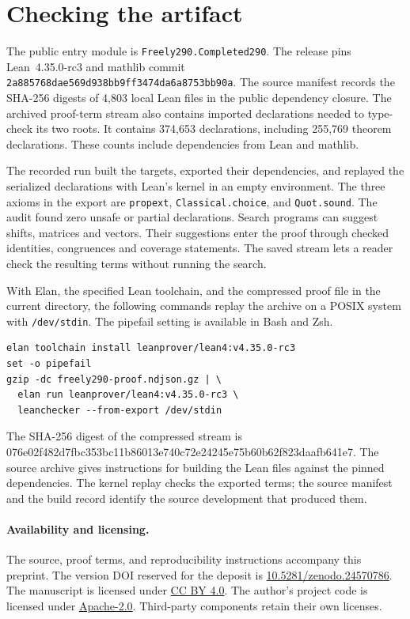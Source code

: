 \documentclass[11pt,a4paper]{article}
\newcommand{\code}[1]{\texttt{#1}}
\begin{document}
\section{Checking the artifact}
The public entry module is \code{Freely290.Completed290}. The release
pins Lean~4.35.0-rc3 \cite{Lean} and mathlib commit
\code{2a885768dae569d938bb9ff3474da6a8753bb90a}.
The source manifest records the SHA-256 digests of 4,803 local Lean
files in the public dependency closure. The archived proof-term stream
also contains imported declarations needed to type-check its two roots.
It contains 374,653 declarations, including 255,769 theorem declarations.
These counts include dependencies from Lean and mathlib.

The recorded run built the targets, exported their dependencies, and
replayed the serialized declarations with Lean's kernel in an empty
environment. The three axioms in the export are \code{propext},
\code{Classical.choice}, and \code{Quot.sound}. The audit found zero
unsafe or partial declarations. Search programs can suggest shifts,
matrices and vectors. Their suggestions enter the proof through checked
identities, congruences and coverage statements. The saved stream lets a
reader check the resulting terms without running the search.

With Elan, the specified Lean toolchain, and the compressed proof file
in the current directory, the following commands replay the archive on
a POSIX system with \code{/dev/stdin}. The pipefail setting is available
in Bash and Zsh.
\begin{verbatim}
elan toolchain install leanprover/lean4:v4.35.0-rc3
set -o pipefail
gzip -dc freely290-proof.ndjson.gz | \
  elan run leanprover/lean4:v4.35.0-rc3 \
  leanchecker --from-export /dev/stdin
\end{verbatim}
The SHA-256 digest of the compressed stream is\\
{\small\ttfamily 076e02f482d7fbc353bc11b86013e740c72e24245e75b60b62f823daafb641e7}.
The source archive gives instructions for building the Lean files against
the pinned dependencies. The kernel replay checks the exported terms;
the source manifest and the build record identify the source development
that produced them.

\paragraph{Availability and licensing.}
The source, proof terms, and reproducibility instructions accompany
this preprint. The version DOI reserved for the deposit is \href{https://doi.org/10.5281/zenodo.24570786}{10.5281/zenodo.24570786}.
The manuscript is licensed under
\href{https://creativecommons.org/licenses/by/4.0/}{CC BY 4.0}.
The author's project code is licensed under
\href{https://www.apache.org/licenses/LICENSE-2.0}{Apache-2.0}.
Third-party components retain their own licenses.
\end{document}
